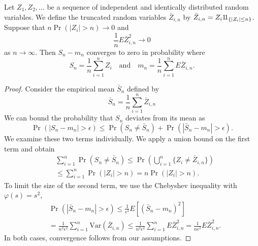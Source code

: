 \begin{lemma} \label{lemma:WeakLawTruncated}
Let $Z_1, Z_2, \ldots$ be a sequence of independent and identically distributed random variables.
We define the truncated random variables $\bar{Z}_{i,n}$ by $\bar{Z}_{i,n} = Z_i \mathrm{1\!1}_{\{ |Z_i| \leq n \}}$.
Suppose that $n \Pr (|Z_i| > n) \rightarrow 0$ and
\begin{equation*}
\frac{1}{n} E \bar{Z}_{i,n}^2 \rightarrow 0
\end{equation*}
as $n \rightarrow \infty$.
Then $S_n - m_n$ converges to zero in probability where
\begin{equation*}
S_n = \frac{1}{n} \sum_{i=1}^n Z_i
\quad \text{and} \quad
m_n = \frac{1}{n} \sum_{i=1}^n E \bar{Z}_{i,n}.
\end{equation*}
\end{lemma}
\begin{proof}
Consider the empirical mean $\bar{S}_n$ defined by
\begin{equation*}
\bar{S}_n = \frac{1}{n} \sum_{i=1}^n \bar{Z}_{i,n}
\end{equation*}
We can bound the probability that $S_n$ deviates from its mean as
\begin{equation*}
\Pr (|S_n - m_n| > \epsilon)
\leq \Pr \left( S_n \neq \bar{S}_n \right) + \Pr ( |\bar{S}_n - m_n| > \epsilon) .
\end{equation*}
We examine these two terms individually.
We apply a union bound on the first term and obtain
\begin{equation*}
\begin{split}
&\sum_{i=1}^n \Pr \left( S_n \neq \bar{S}_n \right)
\leq \Pr \left( \bigcup_{i=1}^n \{ Z_i \neq \bar{Z}_{i,n} \} \right) \\
&\leq \sum_{i=1}^n \Pr (|Z_i| > n) = n \Pr (|Z_i| > n) .
\end{split}
\end{equation*}
To limit the size of the second term, we use the Chebyshev inequality with $\varphi(s) = s^2$,
\begin{equation*}
\begin{split}
&\Pr \left( |\bar{S}_n - m_n| > \epsilon \right)
\leq \frac{1}{\epsilon^2} E \left[ \left( \bar{S}_n - m_n \right)^2 \right] \\
&= \frac{1}{n^2 \epsilon^2} \sum_{i=1}^n \mathrm{Var} \left( \bar{Z}_{i,n} \right)
\leq \frac{1}{n^2 \epsilon^2} \sum_{i=1}^n E \bar{Z}_{i,n}^2
= \frac{1}{n \epsilon^2} E \bar{Z}_{i,n}^2 .
\end{split}
\end{equation*}
In both cases, convergence follows from our assumptions.
\end{proof}

